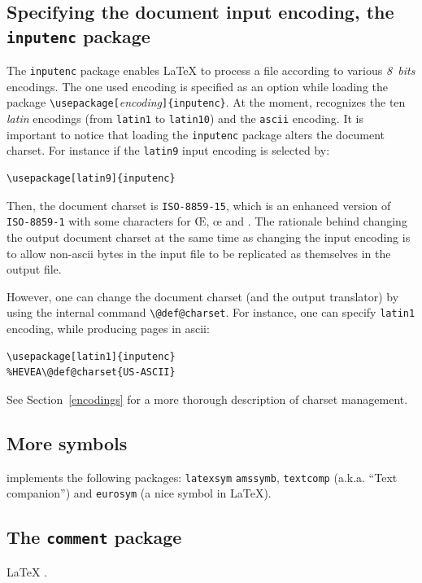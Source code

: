 \subsection{Specifying \label{inputenc}the document input encoding, the \texttt{inputenc} package}
The \texttt{inputenc} package enables \LaTeX{} to process a file
according to various \emph{8~bits} encodings.
The one used encoding is specified as an option while loading the package
\verb+\usepackage[+\textit{encoding}\verb+]{inputenc}+.
At the moment, \hevea{} recognizes the ten \emph{latin} encodings
(from \texttt{latin1} to \texttt{latin10}) and the \texttt{ascii} encoding.
It is important to notice that loading the \verb+inputenc+ package
alters the \html{} document charset.
For instance if the \texttt{latin9} input encoding is selected by:
\begin{verbatim}
\usepackage[latin9]{inputenc}
\end{verbatim}
Then, the document charset is \verb+ISO-8859-15+, which is an
enhanced version of \verb+ISO-8859-1+ with some characters
for \OE, \oe{} and \texteuro.
The rationale behind changing the output document charset at the same
time as changing the input encoding is to allow
non-ascii bytes in the input file to be replicated as
themselves in the output file.

However, one can change the document charset (and the output
translator) by using the internal command \verb+\@def@charset+.
For instance, one can specify \texttt{latin1} encoding, while
producing \html{} pages in ascii:
\begin{verbatim}
\usepackage[latin1]{inputenc}
%HEVEA\@def@charset{US-ASCII}
\end{verbatim}
See Section~\ref{encodings} for a more thorough description of \html{}
charset management.

\subsection{More symbols}
\hevea{} implements the following packages: \texttt{latexsym}
\texttt{amssymb}, \texttt{textcomp} (a.k.a. ``Text companion'')
and \texttt{eurosym} (a nice \texteuro{} symbol in \LaTeX).


\subsection{The \texttt{comment} package}
\LaTeX{} .

